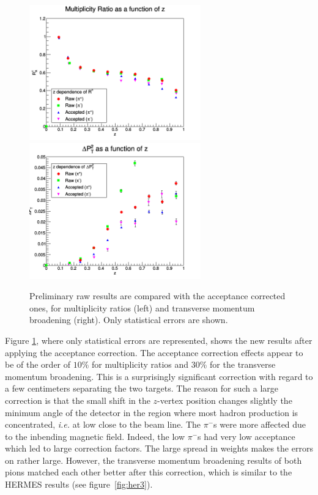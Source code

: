 \begin{figure}[p]
\includegraphics[width=7.4cm] {new-fig/52_zdep_Ratio_Zz_1.png} 
\includegraphics[width=7.4cm] {new-fig/57_zdep_DePts_Zz_1.png} 
\caption {Preliminary raw results are compared with the acceptance corrected ones, 
for multiplicity ratios (left) and transverse momentum broadening 
(right). Only statistical errors are shown.}
\label{fig:AcceptPlots}
\end{figure}

Figure \ref{fig:AcceptPlots}, where only statistical errors are 
represented, shows the new results after applying the acceptance correction.
The acceptance correction effects appear to be of the order of $10$\% for 
multiplicity ratios and $30$\% for the transverse momentum broadening. This 
is a surprisingly significant correction with regard to a few centimeters 
separating the two targets. The reason for such a large correction is that 
the small shift in the $z$-vertex position changes slightly the minimum 
angle of the detector in the region where most hadron production is 
concentrated, {\it i.e.} at low \pt close to the beam line. The 
$\pi^-$s were more affected due to the inbending magnetic field. Indeed, 
the low \pt $\pi^-$s had very low acceptance which led to large correction 
factors. The large spread in weights makes the errors on \dpt rather large. 
However, the transverse momentum broadening 
results of both pions matched each other better after this correction, which is similar 
to the HERMES results (see figure~\ref{fig:her3}).

